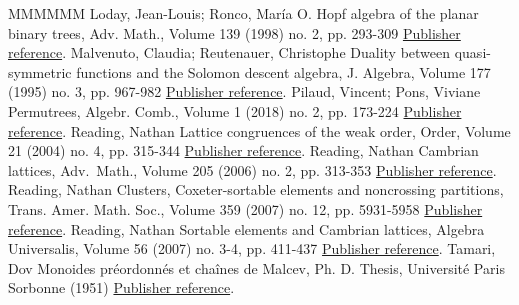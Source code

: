 \begin{thebibliography}{MMMMMM}
 Loday, Jean-Louis; Ronco, María O. Hopf algebra of the planar binary trees, Adv. Math., Volume 139 (1998) no. 2, pp. 293-309 \href{https://alco.centre-mersenne.org/articles/10.5802/alco.249/#LodayRonco}{Publisher reference}.
 Malvenuto, Claudia; Reutenauer, Christophe Duality between quasi-symmetric functions and the Solomon descent algebra, J. Algebra, Volume 177 (1995) no. 3, pp. 967-982 \href{https://alco.centre-mersenne.org/articles/10.5802/alco.249/#MalvenutoReutenauer}{Publisher reference}.
 Pilaud, Vincent; Pons, Viviane Permutrees, Algebr. Comb., Volume 1 (2018) no. 2, pp. 173-224 \href{https://alco.centre-mersenne.org/articles/10.5802/alco.249/#PilaudPons-permutrees}{Publisher reference}.
 Reading, Nathan Lattice congruences of the weak order, Order, Volume 21 (2004) no. 4, pp. 315-344 \href{https://alco.centre-mersenne.org/articles/10.5802/alco.249/#Reading-latticeCongruences}{Publisher reference}.
 Reading, Nathan Cambrian lattices, Adv. Math., Volume 205 (2006) no. 2, pp. 313-353 \href{https://alco.centre-mersenne.org/articles/10.5802/alco.249/#Reading-cambrianLattices}{Publisher reference}.
 Reading, Nathan Clusters, Coxeter-sortable elements and noncrossing partitions, Trans. Amer. Math. Soc., Volume 359 (2007) no. 12, pp. 5931-5958 \href{https://alco.centre-mersenne.org/articles/10.5802/alco.249/#Reading-coxeterSortable}{Publisher reference}.
 Reading, Nathan Sortable elements and Cambrian lattices, Algebra Universalis, Volume 56 (2007) no. 3-4, pp. 411-437 \href{https://alco.centre-mersenne.org/articles/10.5802/alco.249/#Reading-sortableElements}{Publisher reference}.
 Tamari, Dov Monoides préordonnés et chaînes de Malcev, Ph. D. Thesis, Université Paris Sorbonne (1951) \href{https://alco.centre-mersenne.org/articles/10.5802/alco.249/#Tamari}{Publisher reference}.
\end{thebibliography}
